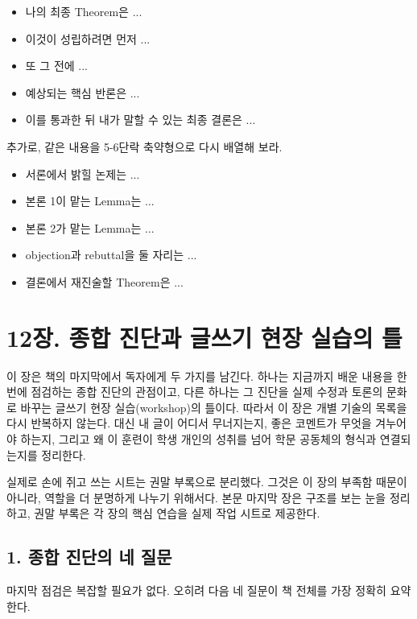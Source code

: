 \begin{itemize}
\tightlist
\item
  나의 최종 Theorem은 ...
\item
  이것이 성립하려면 먼저 ...
\item
  또 그 전에 ...
\item
  예상되는 핵심 반론은 ...
\item
  이를 통과한 뒤 내가 말할 수 있는 최종 결론은 ...
\end{itemize}

추가로, 같은 내용을 5-6단락 축약형으로 다시 배열해 보라.

\begin{itemize}
\tightlist
\item
  서론에서 밝힐 논제는 ...
\item
  본론 1이 맡는 Lemma는 ...
\item
  본론 2가 맡는 Lemma는 ...
\item
  objection과 rebuttal을 둘 자리는 ...
\item
  결론에서 재진술할 Theorem은 ...
\end{itemize}

\chapter{12장. 종합 진단과 글쓰기 현장 실습의 틀}\label{12uxc7a5-uxc885uxd569-uxc9c4uxb2e8uxacfc-uxae00uxc4f0uxae30-uxd604uxc7a5-uxc2e4uxc2b5uxc758-uxd2c0}

이 장은 책의 마지막에서 독자에게 두 가지를 남긴다. 하나는 지금까지 배운 내용을 한 번에 점검하는 종합 진단의 관점이고, 다른 하나는 그 진단을 실제 수정과 토론의 문화로 바꾸는 글쓰기 현장 실습(workshop)의 틀이다. 따라서 이 장은 개별 기술의 목록을 다시 반복하지 않는다. 대신 내 글이 어디서 무너지는지, 좋은 코멘트가 무엇을 겨누어야 하는지, 그리고 왜 이 훈련이 학생 개인의 성취를 넘어 학문 공동체의 형식과 연결되는지를 정리한다.

실제로 손에 쥐고 쓰는 시트는 권말 부록으로 분리했다. 그것은 이 장의 부족함 때문이 아니라, 역할을 더 분명하게 나누기 위해서다. 본문 마지막 장은 구조를 보는 눈을 정리하고, 권말 부록은 각 장의 핵심 연습을 실제 작업 시트로 제공한다.

\section{1. 종합 진단의 네 질문}\label{1-uxc885uxd569-uxc9c4uxb2e8uxc758-uxb124-uxc9c8uxbb38}

마지막 점검은 복잡할 필요가 없다. 오히려 다음 네 질문이 책 전체를 가장 정확히 요약한다.

